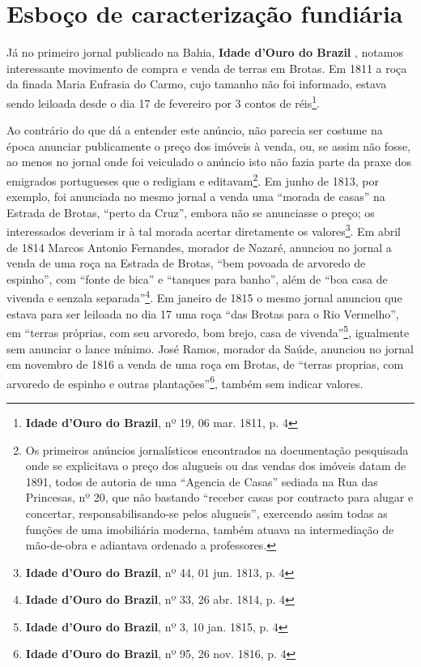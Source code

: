 \section{Esboço de caracterização fundiária}\label{sec:2.3}

Já no primeiro jornal publicado na Bahia, \textbf{Idade d'Ouro do Brazil} \cite[p.~162]{souza_imprensa_1972}, notamos interessante movimento de compra e venda de terras em Brotas. Em 1811 a roça da finada Maria Eufrasia do Carmo, cujo tamanho não foi informado, estava sendo leiloada desde o dia 17 de fevereiro por 3 contos de réis\footnote{\textbf{Idade d'Ouro do Brazil}, nº 19, 06 mar. 1811, p. 4}.

Ao contrário do que dá a entender este anúncio, não parecia ser costume na época anunciar publicamente o preço dos imóveis à venda, ou, se assim não fosse, ao menos no jornal onde foi veiculado o anúncio isto não fazia parte da praxe dos emigrados portugueses que o redigiam e editavam\footnote{Os primeiros anúncios jornalísticos encontrados na documentação pesquisada onde se explicitava o preço dos alugueis ou das vendas dos imóveis datam de 1891, todos de autoria de uma ``Agencia de Casas'' sediada na Rua das Princesas, nº 20, que não bastando ``receber casas por contracto para alugar e concertar, responsabilisando-se pelos alugueis'', exercendo assim todas as funções de uma imobiliária moderna, também atuava na intermediação de mão-de-obra e adiantava ordenado a professores.}. Em junho de 1813, por exemplo, foi anunciada no mesmo jornal a venda uma ``morada de casas'' na Estrada de Brotas, ``perto da Cruz'', embora não se anunciasse o preço; os interessados deveriam ir à tal morada acertar diretamente os valores\footnote{\textbf{Idade d'Ouro do Brazil}, nº 44, 01 jun. 1813, p. 4}. Em abril de 1814 Marcos Antonio Fernandes, morador de Nazaré, anunciou no jornal a venda de uma roça na Estrada de Brotas, ``bem povoada de arvoredo de espinho'', com ``fonte de bica'' e ``tanques para banho'', além de ``boa casa de vivenda e senzala separada''\footnote{\textbf{Idade d'Ouro do Brazil}, nº 33, 26 abr. 1814, p. 4}. Em janeiro de 1815 o mesmo jornal anunciou que estava para ser leiloada no dia 17 uma roça ``das Brotas para o Rio Vermelho'', em ``terras próprias, com seu arvoredo, bom brejo, casa de vivenda''\footnote{\textbf{Idade d'Ouro do Brazil}, nº 3, 10 jan. 1815, p. 4}, igualmente sem anunciar o lance mínimo. José Ramos, morador da Saúde, anunciou no jornal em novembro de 1816 a venda de uma roça em Brotas, de ``terras proprias, com arvoredo de espinho e outras plantações''\footnote{\textbf{Idade d'Ouro do Brazil}, nº 95, 26 nov. 1816, p. 4}, também sem indicar valores. 


